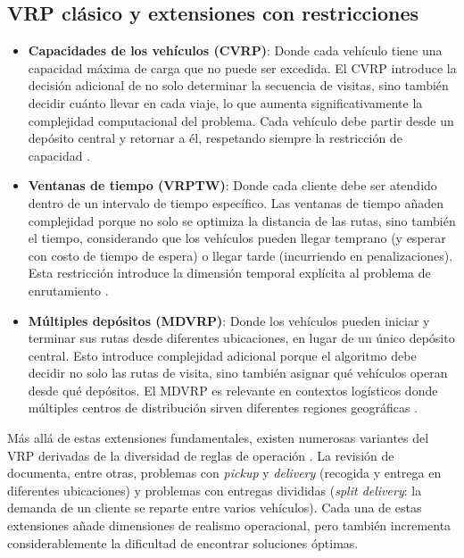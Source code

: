 \documentclass[12pt,letterpaper,oneside]{book}
\begin{document}
\subsection{VRP clásico y extensiones con restricciones } %

\begin{itemize}
	\item \textbf{Capacidades de los vehículos (CVRP)}: Donde cada vehículo tiene una capacidad 
	máxima de carga que no puede ser excedida. El CVRP introduce la decisión adicional de no solo 
	determinar la secuencia de visitas, sino también decidir cuánto llevar en cada viaje, 
	lo que aumenta significativamente la complejidad computacional del problema. Cada vehículo debe 
	partir desde un depósito central y retornar a él, respetando siempre la restricción de capacidad \citep{Caceres-Cruz2014}.
	
	\item \textbf{Ventanas de tiempo (VRPTW)}: Donde cada cliente debe ser atendido dentro de un 
	intervalo de tiempo específico. Las ventanas de tiempo añaden complejidad porque no solo se optimiza 
	la distancia de las rutas, sino también el tiempo, considerando que los vehículos pueden llegar 
	temprano (y esperar con costo de tiempo de espera) o llegar tarde (incurriendo en penalizaciones). 
	Esta restricción introduce la dimensión temporal explícita al problema de enrutamiento \citep{Caceres-Cruz2014}.
	
	\item \textbf{Múltiples depósitos (MDVRP)}: Donde los vehículos pueden iniciar y terminar sus rutas
	desde diferentes ubicaciones, en lugar de un único depósito central. Esto introduce complejidad 
	adicional porque el algoritmo debe decidir no solo las rutas de visita, sino también asignar 
	qué vehículos operan desde qué depósitos. El MDVRP es relevante en contextos logísticos donde 
	múltiples centros de distribución sirven diferentes regiones geográficas \citep{Caceres-Cruz2014}.
\end{itemize}

Más allá de estas extensiones fundamentales, existen numerosas variantes del VRP derivadas de la diversidad de
reglas de operación \citep{Laporte2009VRPSurvey}. La revisión de \citet{Caceres-Cruz2014} documenta, entre otras,
problemas con \textit{pickup} y \textit{delivery} (recogida y entrega en diferentes ubicaciones) y problemas con
entregas divididas (\textit{split delivery}: la demanda de un cliente se reparte entre varios vehículos). Cada una de estas extensiones añade dimensiones de realismo
operacional, pero también incrementa considerablemente la dificultad de encontrar soluciones óptimas.
\end{document}
